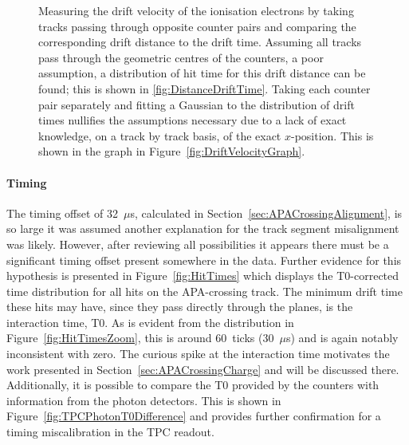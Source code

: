\begin{figure}
  \caption[Measuring the drift velocity of the ionisation electrons by taking tracks passing through opposite counter pairs and comparing the corresponding drift distance to the drift time.]{Measuring the drift velocity of the ionisation electrons by taking tracks passing through opposite counter pairs and comparing the corresponding drift distance to the drift time.  Assuming all tracks pass through the geometric centres of the counters, a poor assumption, a distribution of hit time for this drift distance can be found; this is shown in \ref{fig:DistanceDriftTime}.  Taking each counter pair separately and fitting a Gaussian to the distribution of drift times nullifies the assumptions necessary due to a lack of exact knowledge, on a track by track basis, of the exact $x$-position.  This is shown in the graph in Figure~\ref{fig:DriftVelocityGraph}.}
  \label{fig:DriftVelocity}
\end{figure}

\paragraph{Timing}

The timing offset of 32~$\mu$s, calculated in Section~\ref{sec:APACrossingAlignment}, is so large it was assumed another explanation for the track segment misalignment was likely.  However, after reviewing all possibilities it appears there must be a significant timing offset present somewhere in the data.  Further evidence for this hypothesis is presented in Figure~\ref{fig:HitTimes} which displays the T0-corrected time distribution for all hits on the APA-crossing track.  The minimum drift time these hits may have, since they pass directly through the planes, is the interaction time, T0.  As is evident from the distribution in Figure~\ref{fig:HitTimesZoom}, this is around 60~ticks (30~$\mu$s) and is again notably inconsistent with zero.  The curious spike at the interaction time motivates the work presented in Section~\ref{sec:APACrossingCharge} and will be discussed there.  Additionally, it is possible to compare the T0 provided by the counters with information from the photon detectors.  This is shown in Figure~\ref{fig:TPCPhotonT0Difference} and provides further confirmation for a timing miscalibration in the TPC readout.

